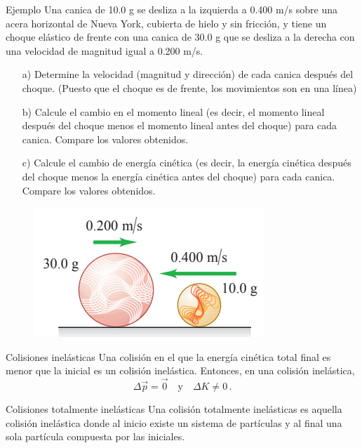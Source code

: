 \begin{frame}{Ejemplo}
    Una canica de 10.0 g
se desliza a la izquierda a 0.400 m/s sobre una acera horizontal de Nueva York, cubierta de hielo y sin fricción, y tiene un choque elástico de
frente con una canica de 30.0 g
que se desliza a la derecha con
una velocidad de magnitud igual
a 0.200 m/s.

\begin{itemize}
    \item[a)] Determine la velocidad (magnitud y dirección) de cada canica después del choque. (Puesto que el choque es de frente, los movimientos son en una línea)
    \item[b)] Calcule el cambio en el momento lineal (es decir, el momento lineal después del choque menos el momento lineal antes del choque) para cada canica. Compare los valores obtenidos.
    \item[c)] Calcule el cambio de energía cinética (es decir, la energía cinética
después del choque menos la energía cinética antes del choque) para
cada canica. Compare los valores obtenidos.
\end{itemize}

\begin{figure}
    \centering
    \includegraphics[width=0.25\linewidth]{figures/choque3.png}
\end{figure}

\end{frame}

\begin{frame}{Colisiones inelásticas}
    Una colisión en el que la energía cinética total final es menor que la inicial es un colisión inelástica. Entonces, en una colisión inelástica, \begin{equation*}
        \Delta\vec{p}=\vec{0}\quad\text{y}\quad\Delta K \neq 0\,.
    \end{equation*}
\end{frame}

\begin{frame}{Colisiones totalmente inelásticas}
    Una colisión totalmente inelásticas es aquella colisión inelástica donde al inicio existe un sistema de partículas y al final una sola partícula compuesta por las iniciales.
\end{frame}

